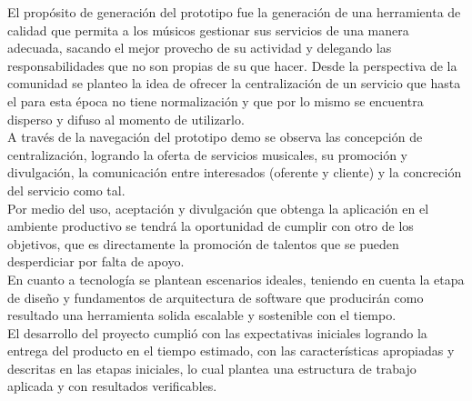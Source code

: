 El propósito de generación del prototipo fue la generación de una herramienta de calidad que permita a los músicos gestionar sus servicios de una manera adecuada, sacando el mejor provecho de su actividad y delegando las responsabilidades que no son propias de su que hacer. Desde la perspectiva de la comunidad se planteo la idea de ofrecer la centralización de un servicio que hasta el para esta época no tiene normalización y que por lo mismo se encuentra disperso y difuso al momento de utilizarlo.\\

 A través de la navegación del prototipo demo se observa las concepción de centralización, logrando la oferta de servicios musicales, su promoción y divulgación, la comunicación entre interesados (oferente y cliente) y la concreción del servicio como tal.\\
 
Por medio del uso, aceptación y divulgación que obtenga la aplicación en el ambiente productivo se tendrá la oportunidad de cumplir con otro de los objetivos, que es directamente la promoción de talentos que se pueden desperdiciar por falta de apoyo.\\

En cuanto a tecnología se plantean escenarios ideales, teniendo en cuenta la etapa de diseño y fundamentos de arquitectura de software que producirán como resultado una herramienta solida escalable y sostenible con el tiempo. \\

El desarrollo del proyecto cumplió con las expectativas iniciales logrando la entrega del producto en el tiempo estimado, con las características apropiadas y descritas en las etapas iniciales, lo cual plantea una estructura de trabajo aplicada y con resultados verificables.
